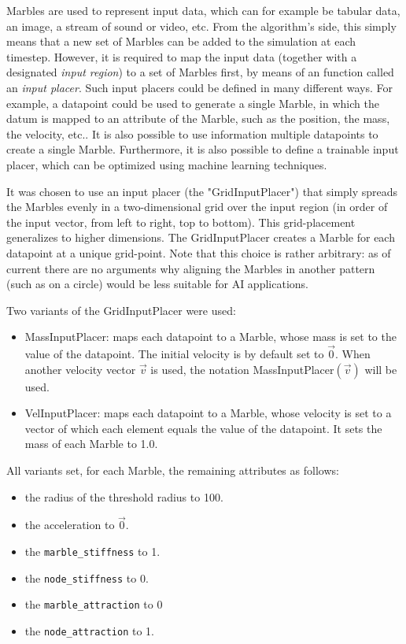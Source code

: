 Marbles are used to represent input data, which can for example be tabular data, an image, a stream of sound or video, etc.
From the algorithm's side,
this simply means that a new set of Marbles can be added to the simulation at each timestep.
However, it is required to map the input data (together with a designated \textit{input region}) to a set of Marbles first, by means of an function called an \textit{input placer}.
Such input placers could be defined in many different ways. 
For example, a datapoint could be used to generate a single Marble, in which the datum is mapped to an attribute of the Marble, such as the position, the mass, the velocity, etc..
It is also possible to use information multiple datapoints to create a single Marble.
Furthermore, it is also possible to define a trainable input placer, which can be optimized using machine learning techniques.

It was chosen to use an input placer (the "GridInputPlacer") that simply spreads the Marbles evenly in a two-dimensional grid over the input region (in order of the input vector, from left to right, top to bottom). This grid-placement generalizes to higher dimensions. The GridInputPlacer creates a Marble for each datapoint at a unique grid-point.
Note that this choice is rather arbitrary: as of current there are no arguments why aligning the Marbles in another pattern (such as on a circle) would be less suitable for AI applications.

Two variants of the GridInputPlacer were used:
\begin{itemize}
	\item MassInputPlacer: maps each datapoint to a Marble, whose mass is set to the value of the datapoint. The initial velocity is by default set to $\vec{0}$. When another velocity vector $\vec{v}$ is used, the notation MassInputPlacer$(\vec{v})$ will be used.
	\item VelInputPlacer: maps each datapoint to a Marble, whose velocity is set to a vector of which each element equals the value of the datapoint. It sets the mass of each Marble to 1.0.
\end{itemize}

All variants set, for each Marble, the remaining attributes as follows:
\begin{itemize}
	\item the radius of the threshold radius to 100.
	\item the acceleration to $\vec{0}$.
	\item the \texttt{marble\_stiffness} to 1.
	\item the \texttt{node\_stiffness} to 0.
	\item the \texttt{marble\_attraction} to 0
	\item the \texttt{node\_attraction} to 1.
\end{itemize}

